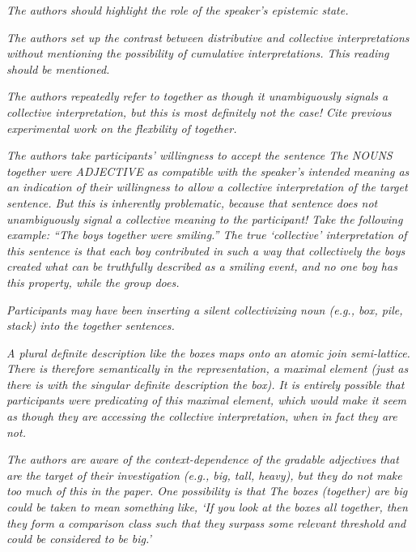 \documentclass[12pt]{article}
\begin{document}
\item \emph{The authors should highlight the role of the speaker's epistemic state.}

\item \emph{The authors set up the contrast between distributive and collective interpretations without mentioning the possibility of cumulative interpretations. This reading should be mentioned.}

\item \emph{The authors repeatedly refer to \emph{together} as though it unambiguously signals a collective interpretation, but this is most definitely not the case! Cite previous experimental work on the flexbility of \emph{together}.}

\item \emph{The authors take participants' willingness to accept the sentence The NOUNS together were ADJECTIVE as compatible with the speaker's intended meaning as an indication of their willingness to allow a collective interpretation of the target sentence. But this is inherently problematic, because that sentence does not unambiguously signal a collective meaning to the participant! Take the following example: ``The boys together were smiling.'' The true `collective' interpretation of this sentence is that each boy contributed in such a way that collectively the boys created what can be truthfully described as a smiling event, and no one boy has this property, while the group does.}

\item \emph{Participants may have been inserting a silent collectivizing noun (e.g., \emph{box}, \emph{pile}, \emph{stack}) into the together sentences.}

\item \emph{A plural definite description like the boxes maps onto an atomic join semi-lattice. There is therefore semantically in the representation, a maximal element (just as there is with the singular definite description the box). It is entirely possible that participants were predicating of this maximal element, which would make it seem as though they are accessing the collective interpretation, when in fact they are not.}

\item \emph{The authors are aware of the context-dependence of the gradable adjectives that are the target of their investigation (e.g., \emph{big}, \emph{tall}, \emph{heavy}), but they do not make too much of this in the paper. One possibility is that \emph{The boxes (together) are big} could be taken to mean something like, `If you look at the boxes all together, then they form a comparison class such that they surpass some relevant threshold and could be considered to be big.'}
\end{document}
